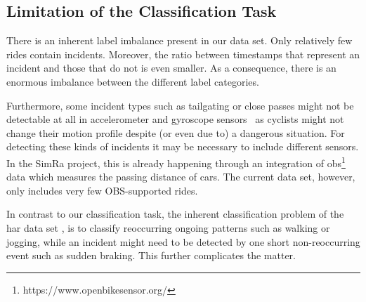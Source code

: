 \subsection{Limitation of the Classification Task}
\label{subsec:limitation_of_the_classification_task}
There is an inherent label imbalance present in our data set.
Only relatively few rides contain incidents. 
Moreover, the ratio between timestamps that represent an incident and those that do not is even smaller. 
As a consequence, there is an enormous imbalance between the different label categories.

Furthermore, some incident types such as tailgating or close passes might not be detectable at all in accelerometer and gyroscope sensors~\cite{aldred2018predictors, karakaya2020simra} as cyclists might not change their motion profile despite (or even due to) a dangerous situation.
For detecting these kinds of incidents it may be necessary to include different sensors.
In the SimRa project, this is already happening through an integration of \ac{obs}\footnote{https://www.openbikesensor.org/} data which measures the passing distance of cars.
The current data set, however, only includes very few OBS-supported rides.

In contrast to our classification task, the inherent classification problem of the \ac{har} data set \cite{anguita2013public}, is to classify reoccurring ongoing patterns such as walking or jogging, while an incident might need to be detected by one short non-reoccurring event such as sudden braking.
This further complicates the matter.

